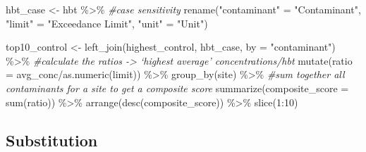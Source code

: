 \documentclass[12pt, twoside]{amherstthesis}
\newenvironment{Shaded}{\begin{snugshade}}{\end{snugshade}}
\newcommand{\AttributeTok}[1]{\textcolor[rgb]{0.77,0.63,0.00}{#1}}
\newcommand{\CommentTok}[1]{\textcolor[rgb]{0.56,0.35,0.01}{\textit{#1}}}
\newcommand{\DecValTok}[1]{\textcolor[rgb]{0.00,0.00,0.81}{#1}}
\newcommand{\FunctionTok}[1]{\textcolor[rgb]{0.00,0.00,0.00}{#1}}
\newcommand{\NormalTok}[1]{#1}
\newcommand{\OtherTok}[1]{\textcolor[rgb]{0.56,0.35,0.01}{#1}}
\newcommand{\SpecialCharTok}[1]{\textcolor[rgb]{0.00,0.00,0.00}{#1}}
\newcommand{\StringTok}[1]{\textcolor[rgb]{0.31,0.60,0.02}{#1}}
\begin{document}
\begin{Shaded}
\begin{Highlighting}[]
\NormalTok{hbt\_case }\OtherTok{\textless{}{-}}\NormalTok{ hbt }\SpecialCharTok{\%\textgreater{}\%} \CommentTok{\#case sensitivity}
  \FunctionTok{rename}\NormalTok{(}\StringTok{"contaminant"} \OtherTok{=} \StringTok{"Contaminant"}\NormalTok{,}
         \StringTok{"limit"} \OtherTok{=} \StringTok{"Exceedance Limit"}\NormalTok{,}
         \StringTok{"unit"} \OtherTok{=} \StringTok{"Unit"}\NormalTok{) }
  
\NormalTok{top10\_control }\OtherTok{\textless{}{-}} \FunctionTok{left\_join}\NormalTok{(highest\_control, hbt\_case, }\AttributeTok{by =} \StringTok{"contaminant"}\NormalTok{) }\SpecialCharTok{\%\textgreater{}\%}
  \CommentTok{\#calculate the ratios {-}\textgreater{} ‘highest average’ concentrations/hbt}
  \FunctionTok{mutate}\NormalTok{(}\AttributeTok{ratio =}\NormalTok{ avg\_conc}\SpecialCharTok{/}\FunctionTok{as.numeric}\NormalTok{(limit)) }\SpecialCharTok{\%\textgreater{}\%} 
  \FunctionTok{group\_by}\NormalTok{(site) }\SpecialCharTok{\%\textgreater{}\%}
  \CommentTok{\#sum together all contaminants for a site to get a composite score}
  \FunctionTok{summarize}\NormalTok{(}\AttributeTok{composite\_score =} \FunctionTok{sum}\NormalTok{(ratio)) }\SpecialCharTok{\%\textgreater{}\%} 
  \FunctionTok{arrange}\NormalTok{(}\FunctionTok{desc}\NormalTok{(composite\_score)) }\SpecialCharTok{\%\textgreater{}\%}
  \FunctionTok{slice}\NormalTok{(}\DecValTok{1}\SpecialCharTok{:}\DecValTok{10}\NormalTok{)}
\end{Highlighting}
\end{Shaded}
\hypertarget{substitution}{%
\subsection{Substitution}\label{substitution}}
\end{document}
